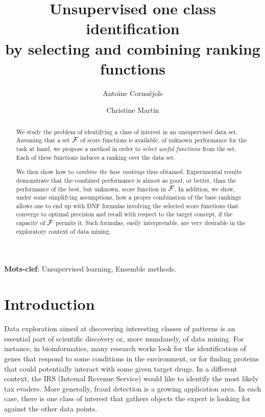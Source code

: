 \documentclass[twocolumn,english]{article}
\title{Unsupervised one class identification \\
by selecting and combining ranking functions}
\author[1]{Antoine Cornu\'ejols}%
\author[1]{Christine Martin}
\affil[1]{AgroParisTech, d\'epartement MMIP et INRA UMR-518\\
    16, rue Claude Bernard \\
    F-75231 Paris Cedex 5 (France)}
\begin{document}
\maketitle


\begin{abstract}
We study the problem of identifying a class of interest in an unsupervised data set. Assuming that a set ${\cal F}$ of score functions is available, of unknown performance for the task at hand, we propose a method in order to \textit{select useful functions} from the set. Each of these functions induces a ranking over the data set. 

We then show how to \textit{combine the base rankings} thus obtained. Experimental results demonstrate that the combined performance is almost as good, or better, than the performance of the best, but unknown, score function in ${\cal F}$. In addition, we show, under some simplifying assumptions, how a proper combination of the base rankings allows one to end up with DNF formulas involving the selected score functions that converge to optimal precision and recall with respect to the target concept, if the capacity of ${\cal F}$ permits it. Such formulas, easily interpretable, are very desirable in the exploratory context of data mining. 

\end{abstract}

\medskip

\noindent\textbf{Mots-clef}: Unsupervised learning, Ensemble methods.


\section{Introduction}

Data exploration aimed at discovering interesting classes of patterns is an essential part of scientific discovery or, more mundanely, of data mining. For instance, in bioinformatics, many research works look for the identification of genes that respond to some conditions in the environment, or for finding proteins that could potentially interact with some given target drugs. In a different context, the IRS (Internal Revenue Service) would like to identify the most likely tax evaders. More generally, fraud detection is a growing application area. In each case, there is one class of interest that gathers objects the expert is looking for against the other data points. 
\end{document}
